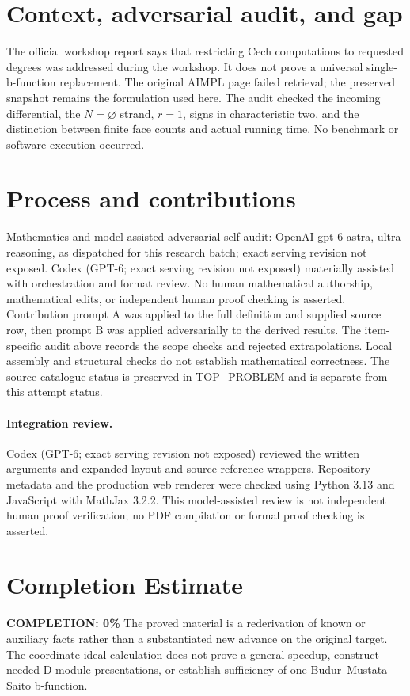 \documentclass[11pt]{article}
\begin{document}
\section{Context, adversarial audit, and gap}
The official workshop report says that restricting Cech computations to
requested degrees was addressed during the workshop. It does not prove a
universal single-b-function replacement. The original AIMPL page failed
retrieval; the preserved snapshot remains the formulation used here.
The audit checked the incoming differential, the $N=\varnothing$ strand,
$r=1$, signs in characteristic two, and the distinction between finite face
counts and actual running time. No benchmark or software execution occurred.

\section{Process and contributions}
Mathematics and model-assisted adversarial self-audit: OpenAI gpt-6-astra, ultra reasoning, as dispatched for this research batch; exact serving revision not exposed. Codex (GPT-6; exact serving revision not exposed) materially assisted with orchestration and format review. No human mathematical authorship, mathematical edits, or independent human proof checking is asserted.
Contribution prompt A was applied to the full definition and supplied source row, then prompt B was applied adversarially to the derived results. The item-specific audit above records the scope checks and rejected extrapolations. Local assembly and structural checks do not establish mathematical correctness. The source catalogue status is preserved in TOP\_PROBLEM and is separate from this attempt status.
\paragraph{Integration review.} Codex (GPT-6; exact serving revision not exposed) reviewed the written arguments and expanded layout and source-reference wrappers. Repository metadata and the production web renderer were checked using Python 3.13 and JavaScript with MathJax 3.2.2. This model-assisted review is not independent human proof verification; no PDF compilation or formal proof checking is asserted.

\section{Completion Estimate}
\noindent\textbf{COMPLETION: 0\%}
The proved material is a rederivation of known or auxiliary facts rather than a substantiated new advance on the original target. The coordinate-ideal calculation does not prove a general speedup, construct needed D-module presentations, or establish sufficiency of one Budur--Mustata--Saito b-function.
\end{document}
